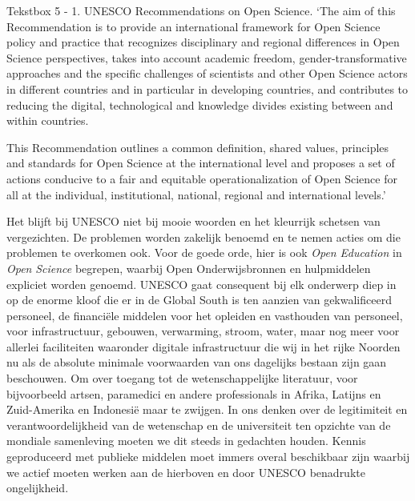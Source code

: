 \documentclass[smallauthor, chapterhaspagenum, nochapterinheader, pagenuminheader,  bigchapnum,medium2, tocpages,  garamond, titleinheader]{jote-book}
\begin{document}
	\begin{bookbox}{Tekstbox 5 - 1. UNESCO Recommendations on Open Science.}
		‘The aim of this Recommendation is to provide an international framework for Open Science policy and practice that recognizes disciplinary and regional differences in Open Science perspectives, takes into account academic freedom, gender-transformative approaches and the specific challenges of scientists and other Open Science actors in different countries and in particular in developing countries, and contributes to reducing the digital, technological and knowledge divides existing between and within countries.

		\vspace*{\baselineskip}

		This Recommendation outlines a common definition, shared values, principles and standards for Open Science at the international level and proposes a set of actions conducive to a fair and equitable operationalization of Open Science for all at the individual, institutional, national, regional and international levels.'
	\end{bookbox}

	Het blijft bij UNESCO niet bij mooie woorden en het kleurrijk schetsen van vergezichten. De problemen worden zakelijk benoemd en te nemen acties om die problemen te overkomen ook. Voor de goede orde, hier is ook \emph{Open }\emph{Education} in \emph{Open }\emph{Science} begrepen, waarbij Open Onderwijsbronnen en hulpmiddelen expliciet worden genoemd. UNESCO gaat consequent bij elk onderwerp diep in op de enorme kloof die er in de Global South is ten aanzien van gekwalificeerd personeel, de financiële middelen voor het opleiden en vasthouden van personeel, voor infrastructuur, gebouwen, verwarming, stroom, water, maar nog meer voor allerlei faciliteiten waaronder digitale infrastructuur die wij in het rijke Noorden nu als de absolute minimale voorwaarden van ons dagelijks bestaan zijn gaan beschouwen. Om over toegang tot de wetenschappelijke literatuur, voor bijvoorbeeld artsen, paramedici en andere professionals in Afrika, Latijns en Zuid-Amerika en Indonesië maar te zwijgen. In ons denken over de legitimiteit en verantwoordelijkheid van de wetenschap en de universiteit ten opzichte van de mondiale samenleving moeten we dit steeds in gedachten houden. Kennis geproduceerd met publieke middelen moet immers overal beschikbaar zijn waarbij we actief moeten werken aan de hierboven en door UNESCO benadrukte ongelijkheid.
\end{document}
